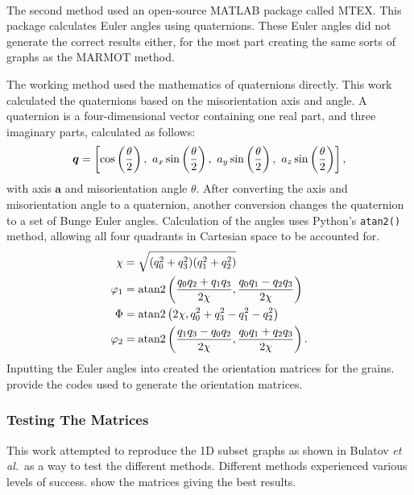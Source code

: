 \documentclass[twoside,senior]{BYUPhys}
\begin{document}
The second method used an open-source MATLAB\textsuperscript{\textregistered} package called MTEX.\cite{bachmann2010}  This package calculates Euler angles using quaternions.  These Euler angles did not generate the correct results either, for the most part creating the same sorts of graphs as the MARMOT method.

The working method used the mathematics of quaternions directly.\cite{weisstein2004}  This work calculated the quaternions based on the misorientation axis and angle.  A quaternion is a four-dimensional vector containing one real part, and three imaginary parts, calculated as follows:
\begin{equation}
\label{eq:quat}
\bm{q}=\left[\textnormal{cos}\left(\frac{\theta}{2}\right),\ a_x\,\textnormal{sin}\left(\frac{\theta}{2}\right),\ a_y\,\textnormal{sin}\left(\frac{\theta}{2}\right),\ a_z\,\textnormal{sin}\left(\frac{\theta}{2}\right)\right],
\end{equation}
with axis $\bm{a}$ and misorientation angle $\theta$.  After converting the axis and misorientation angle to a quaternion, another conversion changes the quaternion to a set of Bunge Euler angles.  Calculation of the angles uses Python's \lstinline!atan2()! method, allowing all four quadrants in Cartesian space to be accounted for.
\begin{align}
\label{eq:quat2euler}
\begin{aligned}
\chi &= \sqrt{(q_0^2+q_3^2)(q_1^2+q_2^2)}\\
\varphi_1 &= \textnormal{atan2}\left(\frac{q_0q_2+q_1q_3}{2\chi}, \frac{q_0q_1-q_2q_3}{2\chi}\right)\\
\Phi &= \textnormal{atan2}\left(2\chi, q_0^2+q_3^2-q_1^2-q_2^2\right)\\
\varphi_2 &= \textnormal{atan2}\left(\frac{q_1q_3-q_0q_2}{2\chi}, \frac{q_0q_1+q_2q_3}{2\chi}\right).
\end{aligned}
\end{align}
Inputting the Euler angles into  created the orientation matrices for the grains.   provide the codes used to generate the orientation matrices.

\subsubsection{Testing The Matrices\label{PQ:Testing}}
This work attempted to reproduce the 1D subset graphs as shown in Bulatov \emph{et al.}\ as a way to test the different methods.  Different methods experienced various levels of success.   show the matrices giving the best results.
\end{document}
